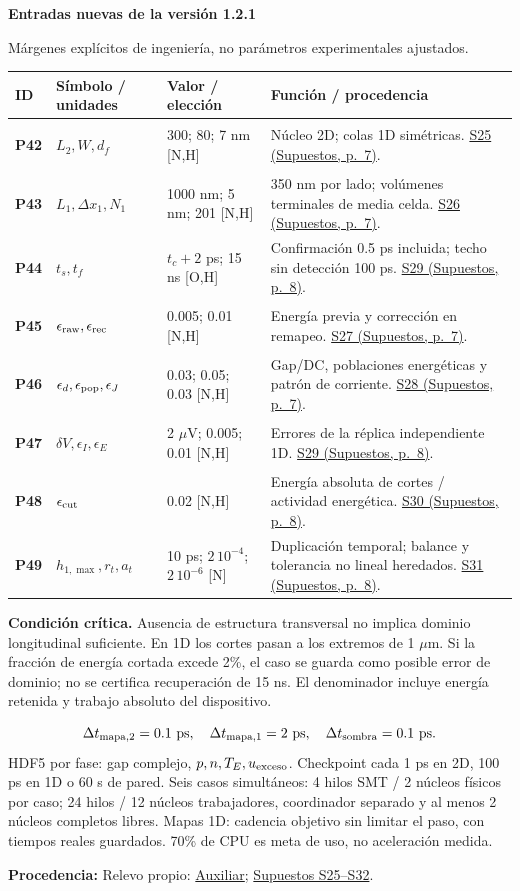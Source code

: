 \documentclass[11pt,a4paper]{article}
\makeatletter
\newcommand{\block}[1]{\par\vspace{6pt}{\large\bfseries\color{ink}#1}\par\vspace{3pt}}
\newcommand{\critical}[1]{\par{\small\raggedright\textbf{\color{accent}Condición crítica.} #1\par}}
\newcommand{\origin}[1]{\par{\footnotesize\raggedright\color{ink}\textbf{Procedencia:} #1\par}}
\newcommand{\sref}[2]{\href{Supuestos.pdf\#nameddest=#1}{#1 (Supuestos, p.~#2)}}
\newcommand{\ptrow}[4]{\hypertarget{#1}{\textbf{#1}}&\( \displaystyle #2 \)& #3 & #4\\[4pt]}
\newenvironment{ptable}{\par\small\setlength{\tabcolsep}{4pt}\renewcommand{\arraystretch}{1.12}
\begin{tabular}{@{}p{.075\linewidth}p{.225\linewidth}p{.285\linewidth}p{.355\linewidth}@{}}\hline
\textbf{ID}&\textbf{Símbolo / unidades}&\textbf{Valor / elección}&\textbf{Función / procedencia}\\\hline}
{\hline\end{tabular}\par}
\makeatother
\begin{document}
\clearpage
\hypertarget{dimensional-1d}{}\hypertarget{hybrid-1d}{}
{\LARGE\bfseries\color{ink}Entradas nuevas de la versión 1.2.1}\par
{\small Márgenes explícitos de ingeniería, no parámetros experimentales ajustados.}
\begin{ptable}
\ptrow{P42}{L_2,W,d_f}{300; 80; 7 nm [N,H]}{Núcleo 2D; colas 1D simétricas. \sref{S25}{7}.}
\ptrow{P43}{L_1,\Delta x_1,N_1}{1000 nm; 5 nm; 201 [N,H]}{350 nm por lado; volúmenes terminales de media celda. \sref{S26}{7}.}
\ptrow{P44}{t_s,t_f}{\(t_c+2\) ps; 15 ns [O,H]}{Confirmación 0.5 ps incluida; techo sin detección 100 ps. \sref{S29}{8}.}
\ptrow{P45}{\epsilon_{\rm raw},\epsilon_{\rm rec}}{0.005; 0.01 [N,H]}{Energía previa y corrección en remapeo. \sref{S27}{7}.}
\ptrow{P46}{\epsilon_d,\epsilon_{\rm pop},\epsilon_J}{0.03; 0.05; 0.03 [N,H]}{Gap/DC, poblaciones energéticas y patrón de corriente. \sref{S28}{7}.}
\ptrow{P47}{\delta V,\epsilon_I,\epsilon_E}{2 \(\mu\)V; 0.005; 0.01 [N,H]}{Errores de la réplica independiente 1D. \sref{S29}{8}.}
\ptrow{P48}{\epsilon_{\rm cut}}{0.02 [N,H]}{Energía absoluta de cortes / actividad energética. \sref{S30}{8}.}
\ptrow{P49}{h_{1,\max},r_t,a_t}{10 ps; \(2\,10^{-4}\); \(2\,10^{-6}\) [N]}{Duplicación temporal; balance y tolerancia no lineal heredados. \sref{S31}{8}.}
\end{ptable}
\critical{Ausencia de estructura transversal no implica dominio longitudinal
suficiente. En 1D los cortes pasan a los extremos de 1 \(\mu\)m. Si la fracción de energía cortada excede 2\%, el caso se guarda como
posible error de dominio; no se certifica recuperación de 15 ns. El denominador
incluye energía retenida y trabajo absoluto del dispositivo.}
\block{Muestreo y recursos}
\[
 \Delta t_{{\rm mapa},2}=0.1\ {\rm ps},\quad
 \Delta t_{{\rm mapa},1}=2\ {\rm ps},\quad
 \Delta t_{\rm sombra}=0.1\ {\rm ps}.
\]
{\small HDF5 por fase: gap complejo, \(p,n,T_E,u_{\rm exceso}\).
Checkpoint cada 1 ps en 2D, 100 ps en 1D o 60 s de pared. Seis casos simultáneos:
4 hilos SMT / 2 núcleos físicos por caso; 24 hilos / 12 núcleos trabajadores,
coordinador separado y al menos 2 núcleos completos libres.
Mapas 1D: cadencia objetivo sin limitar el paso, con tiempos reales guardados. 70\% de CPU es meta de uso, no aceleración medida.}
\origin{Relevo propio:
\href{Auxiliar.pdf\#nameddest=dimensional-1d}{Auxiliar};
\href{Supuestos.pdf\#nameddest=S25}{Supuestos S25--S32}.}
\end{document}

